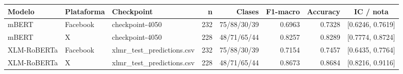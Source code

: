 \begin{tabular}{lllrrrrc}
\toprule
Modelo & Plataforma & Checkpoint & n & Clases & F1-macro & Accuracy & IC / nota \\
\midrule
mBERT & Facebook & checkpoint-4050 & 232 & 75/88/30/39 & 0.6963 & 0.7328 & [0.6246, 0.7619] \\
mBERT & X & checkpoint-4050 & 228 & 48/71/65/44 & 0.8257 & 0.8289 & [0.7774, 0.8724] \\
XLM-RoBERTa & Facebook & xlmr\_test\_predictions.csv & 232 & 75/88/30/39 & 0.7154 & 0.7457 & [0.6435, 0.7764] \\
XLM-RoBERTa & X & xlmr\_test\_predictions.csv & 228 & 48/71/65/44 & 0.8673 & 0.8684 & [0.8216, 0.9116] \\
\bottomrule
\end{tabular}
